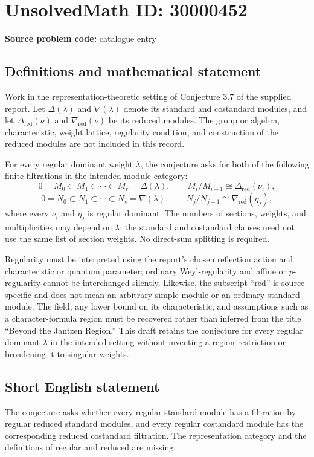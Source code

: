 \documentclass[11pt]{article}
\begin{document}
\section*{UnsolvedMath ID: 30000452}
\textbf{Source problem code:} catalogue entry
\subsection{Definitions and mathematical statement}
Work in the representation-theoretic setting of Conjecture 3.7 of the supplied report. Let $\Delta(\lambda)$ and $\nabla(\lambda)$ denote its standard and costandard modules, and let $\Delta_{\mathrm{red}}(\nu)$ and $\nabla_{\mathrm{red}}(\nu)$ be its reduced modules. The group or algebra, characteristic, weight lattice, regularity condition, and construction of the reduced modules are not included in this record.

For every regular dominant weight $\lambda$, the conjecture asks for both of the following finite filtrations in the intended module category:
\[
 0=M_0\subset M_1\subset\cdots\subset M_r=\Delta(\lambda),
 \qquad M_i/M_{i-1}\cong\Delta_{\mathrm{red}}(\nu_i),
\]
\[
 0=N_0\subset N_1\subset\cdots\subset N_s=\nabla(\lambda),
 \qquad N_j/N_{j-1}\cong\nabla_{\mathrm{red}}(\eta_j),
\]
where every $\nu_i$ and $\eta_j$ is regular dominant. The numbers of sections, weights, and multiplicities may depend on $\lambda$; the standard and costandard clauses need not use the same list of section weights. No direct-sum splitting is required.

Regularity must be interpreted using the report's chosen reflection action and characteristic or quantum parameter; ordinary Weyl-regularity and affine or $p$-regularity cannot be interchanged silently. Likewise, the subscript ``red'' is source-specific and does not mean an arbitrary simple module or an ordinary standard module. The field, any lower bound on its characteristic, and assumptions such as a character-formula region must be recovered rather than inferred from the title ``Beyond the Jantzen Region.'' This draft retains the conjecture for every regular dominant $\lambda$ in the intended setting without inventing a region restriction or broadening it to singular weights.
\subsection{Short English statement}
The conjecture asks whether every regular standard module has a filtration by regular reduced standard modules, and every regular costandard module has the corresponding reduced costandard filtration. The representation category and the definitions of regular and reduced are missing.
\end{document}

